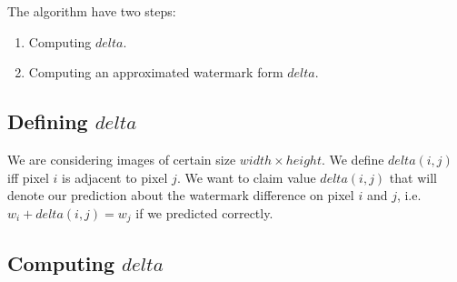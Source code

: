\documentclass[a4paper,12pt]{article}
\begin{document}
The algorithm have two steps:
\begin{enumerate}
    \item Computing $delta$.
    \item Computing an approximated watermark form $delta$.
\end{enumerate}
\subsection{Defining $delta$}

We are considering images of certain size $width\times height$. We define
$delta(i,j)$ iff pixel $i$ is adjacent to pixel $j$. We want to claim value
$delta(i, j)$ that will denote our prediction about the watermark difference on
pixel $i$ and $j$, i.e. $w_i + delta(i, j) = w_j$ if we predicted correctly.
\subsection{Computing $delta$}
\end{document}
